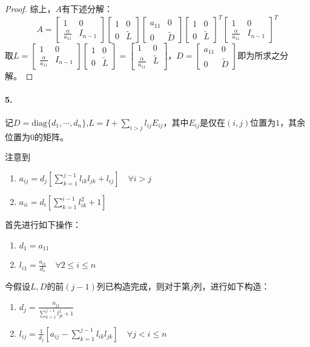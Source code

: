\documentclass{ctexart}
\begin{document}
\begin{proof}
综上，$A$有下述分解：
\[A=\begin{bmatrix}1&0\\\frac{\alpha}{a_{11}}&I_{n-1}\end{bmatrix}
\begin{bmatrix}1&0\\0&\tilde{L}\end{bmatrix}
\begin{bmatrix}a_{11}&0\\0&\tilde{D}\end{bmatrix}
\begin{bmatrix}1&0\\0&\tilde{L}\end{bmatrix}^T
\begin{bmatrix}1&0\\\frac{\alpha}{a_{11}}&I_{n-1}\end{bmatrix}^T\]
取$L=\begin{bmatrix}1&0\\\frac{\alpha}{a_{11}}&I_{n-1}\end{bmatrix}\begin{bmatrix}1&0\\0&\tilde{L}\end{bmatrix}=\begin{bmatrix}1&0\\\frac{\alpha}{a_{11}}&\tilde{L}\end{bmatrix}$，$D=\begin{bmatrix}a_{11}&0\\0&\tilde{D}\end{bmatrix}$即为所求之分解。
\end{proof}

\paragraph{5.}
记$D=\mathrm{diag}\{d_1,\cdots, d_n\}$,$L=I+\sum_{i>j}l_{ij}E_{ij}$，其中$E_{ij}$是仅在$(i,j)$位置为$1$，其余位置为$0$的矩阵。

注意到
\begin{enumerate}
\item $a_{ij}=d_j[\sum\limits_{k=1}^{j-1}l_{ik}l_{jk}+l_{ij}]\quad \forall i>j$
\item $a_{ii}=d_i[\sum\limits_{k=1}^{i-1}l^2_{ik}+1]$
\end{enumerate}

首先进行如下操作：
\begin{enumerate}
\item $d_1=a_{11}$
\item $l_{i1}=\frac{a_{i1}}{d_1}\quad \forall 2\leq i\leq n$
\end{enumerate}
今假设$L,D$的前$(j-1)$列已构造完成，则对于第$j$列，进行如下构造：
\begin{enumerate}
\item $d_j=\frac{a_{jj}}{\sum\limits_{k=1}^{j-1}l_{jk}^2+1}$
\item $l_{ij}=\frac{1}{d_j}[a_{ij}-\sum\limits_{k=1}^{j-1}l_{ik}l_{jk}]\quad \forall j<i\leq n$
\end{enumerate}
\end{document}
